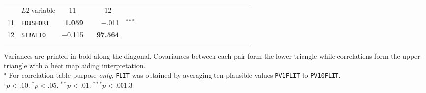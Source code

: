 {\begin{tabular}{cl r@{\hskip -0.1mm}l r@{\hskip -0.1mm}l r@{\hskip -0.1mm}l r@{\hskip -0.1mm}l r@{\hskip -0.1mm}l r@{\hskip -0.1mm}l r@{\hskip -0.1mm}l r@{\hskip -0.1mm}l r@{\hskip -0.1mm}l r@{\hskip -0.1mm}l}
      \cmidrule[0.08em]{1-6}          & $L2$ variable & \multicolumn{1}{c}{11} &       & \multicolumn{1}{c}{12} &       &       &       &       &       &       &       &       &       &       &       &       &       &       &       &       &  \\
      \cmidrule{1-6}    11    & \texttt{EDUSHORT} & \textbf{1.059} &       & \cellcolor[rgb]{ 1,  .988,  .988}$-$.011 & $^{***}$ &       &       &       &       &       &       &       &       &       &       &       &       &       &       &       &  \\
            12    & \texttt{STRATIO} & $-$0.115 &       & \textbf{97.564} &       &       &       &       &       &       &       &       &       &       &       &       &       &       &       &       &  \\
      \cmidrule[0.08em]{1-6}
      &       &       &       &       &       &       &       &       &       &       &       &       &       &       &       &       &       &       &       &       &  \\
      \end{tabular}
}{Variances are printed in bold along the diagonal. Covariances between each pair form the lower-triangle while correlations form the upper-triangle with a heat map aiding interpretation.\\
$^\text{a}$ For correlation table purpose \emph{only}, \texttt{FLIT} was obtained by averaging ten plausible values \texttt{PV1FLIT} to \texttt{PV10FLIT}.\\
$^\dagger p < .10$. $^* p < .05$. $^{**} p < .01$. $^{***} p < .001$.}{3}
